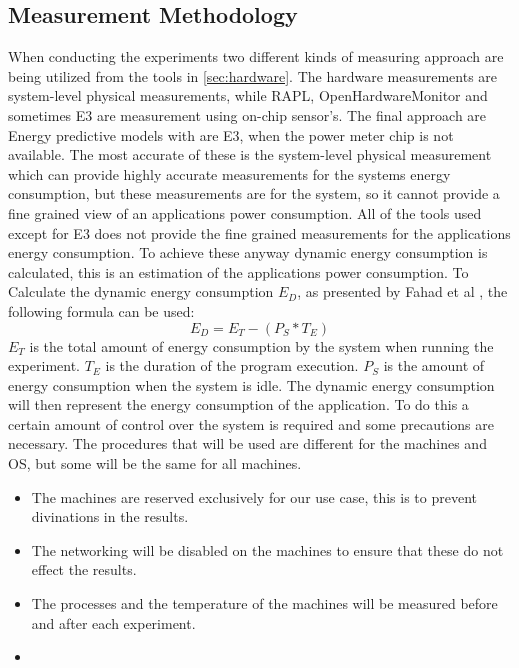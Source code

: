 \subsection{Measurement Methodology}
When conducting the experiments two different kinds of measuring approach are being utilized from the tools in \cref{sec:hardware}.
The hardware measurements are system-level physical measurements, while RAPL, OpenHardwareMonitor and sometimes E3 are measurement using on-chip sensor's. The final approach are Energy predictive models with are E3, when the power meter chip is not available. The most accurate of these is the system-level physical measurement which can provide highly accurate measurements for the systems energy consumption, but these measurements are for the system, so it cannot provide a fine grained view of an applications power consumption. All of the tools used except for E3 does not provide the fine grained measurements for the applications energy consumption. To achieve these anyway dynamic energy consumption is calculated, this is an estimation of the applications power consumption. To Calculate the dynamic energy consumption $E_D$, as presented by Fahad et al \cite{fahad2019comparative}, the following formula can be used:
$$E_D = E_T -(P_S * T_E)$$
$E_T$ is the total amount of energy consumption by the system when running the experiment. $T_E$ is the duration of the program execution. $P_S$ is the amount of energy consumption when the system is idle. The dynamic energy consumption will then represent the energy consumption of the application. To do this a certain amount of control over the system is required and some precautions are necessary. The procedures that will be used are different for the machines and OS, but some will be the same for all machines.
\begin{itemize}
    \item The machines are reserved exclusively for our use case, this is to prevent divinations in the results.
    \item The networking will be disabled on the machines to ensure that these do not effect the results.
    \item The processes and the temperature of the machines will be measured before and after each experiment.
    \item 
\end{itemize}

\cite{sestoft2013microbenchmarks} \cite{fahad2019comparative} \cite{Bokhari2020r3}